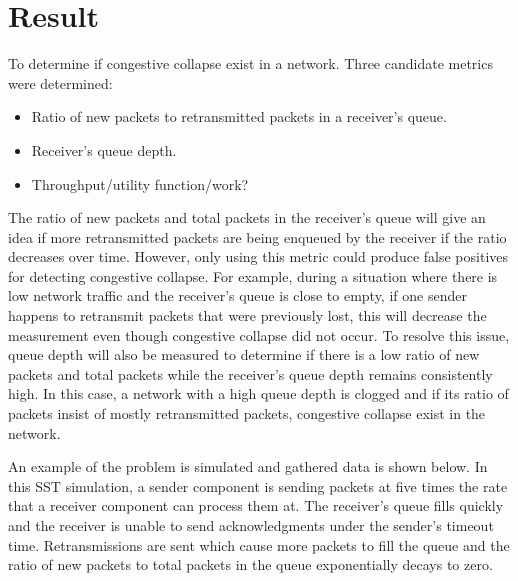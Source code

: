 \documentclass{article}
\begin{document}
\section{Result} %

To determine if congestive collapse exist in a network. Three candidate metrics were determined:

\begin{itemize}
	\item Ratio of new packets to retransmitted packets in a receiver's queue.
	\item Receiver's queue depth.
	\item Throughput/utility function/work?
\end{itemize}

The ratio of new packets and total packets in the receiver's queue will give an idea if more retransmitted packets are being enqueued by the receiver if the ratio decreases over time. However, only using this metric could produce false positives for detecting congestive collapse. For example, during a situation where there is low network traffic and the receiver's queue is close to empty, if one sender happens to retransmit packets that were previously lost, this will decrease the measurement even though congestive collapse did not occur.
To resolve this issue, queue depth will also be measured to determine if there is a low ratio of new packets and total packets while the receiver's queue depth remains consistently high. In this case, a network with a high queue depth is clogged and if its ratio of packets insist of mostly retransmitted packets, congestive collapse exist in the network.


An example of the problem is simulated and gathered data is shown below. In this SST simulation, a sender component is sending packets at five times the rate that a receiver component can process them at. The receiver's queue fills quickly and the receiver is unable to send acknowledgments under the sender's timeout time. Retransmissions are sent which cause more packets to fill the queue and the ratio of new packets to total packets in the queue exponentially decays to zero.
\end{document}
